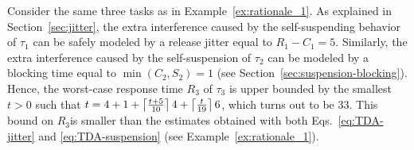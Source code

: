 \begin{example}
\label{ex:rationale_2}  
Consider the same three tasks as in Example~\ref{ex:rationale_1}. As explained in Section~\ref{sec:jitter}, the extra interference caused by the self-suspending behavior of $\tau_1$ can be safely modeled by a release jitter equal to $R_1 - C_1 = 5$. Similarly, the extra interference caused by the self-suspension of $\tau_2$ can be modeled by a blocking time equal to $\min(C_2,S_2) = 1$ (see Section~\ref{sec:suspension-blocking}). Hence, the worst-case response time $R_3$ of $\tau_3$ is upper bounded by the smallest $t>0$ such that $t = 4 + 1 +\left\lceil{ \frac{t + 5}{10} }\right\rceil 4 +\left\lceil{ \frac{t}{19} }\right\rceil 6$, which turns out to be $33$. This bound on $R_3$is smaller than the estimates obtained with both Eqs.~\eqref{eq:TDA-jitter} and \eqref{eq:TDA-suspension} (see Example~\ref{ex:rationale_1}).
\hfill\myendproof
\end{example}






